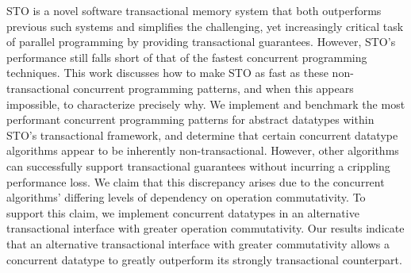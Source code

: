 STO is a novel software transactional memory system that both outperforms previous such systems and simplifies the challenging, yet increasingly critical task of parallel programming by providing transactional guarantees. 
However, STO's performance still falls short of that of the fastest concurrent programming techniques. This work discusses how to make STO as fast as these non-transactional concurrent programming patterns, and when this appears impossible, to characterize precisely why. 
We implement and benchmark the most performant concurrent programming patterns for abstract datatypes within STO's transactional framework, and determine that certain concurrent datatype algorithms appear to be inherently non-transactional. However, other algorithms can successfully support transactional guarantees without incurring a crippling performance loss. We claim that this discrepancy arises due to the concurrent algorithms' differing levels of dependency on operation commutativity. To support this claim, we implement concurrent datatypes in an alternative transactional interface with greater operation commutativity. Our results indicate that an alternative transactional interface with greater commutativity allows a concurrent datatype to greatly outperform its strongly transactional counterpart.
